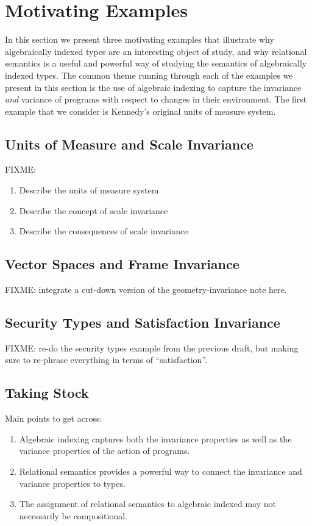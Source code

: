 \section{Motivating Examples}
\label{sec:motivating-examples}

In this section we present three motivating examples that illustrate
why algebraically indexed types are an interesting object of study,
and why relational semantics is a useful and powerful way of studying
the semantics of algebraically indexed types. The common theme running
through each of the examples we present in this section is the use of
algebraic indexing to capture the invariance \emph{and} variance of
programs with respect to changes in their environment. The first
example that we consider is Kennedy's original units of measure
system.

\subsection{Units of Measure and Scale Invariance}
\label{sec:units-of-measure-example-intro}

FIXME:
\begin{enumerate}
\item Describe the units of measure system
\item Describe the concept of scale invariance
\item Describe the consequences of scale invariance
\end{enumerate}

\subsection{Vector Spaces and Frame Invariance}
\label{sec:vector-spaces-intro}

FIXME: integrate a cut-down version of the geometry-invariance note
here.

\subsection{Security Types and Satisfaction Invariance}
\label{sec:security-types-intro}

FIXME: re-do the security types example from the previous draft, but
making sure to re-phrase everything in terms of ``satisfaction''.

\subsection{Taking Stock}
\label{sec:taking-stock}

Main points to get across:
\begin{enumerate}
\item Algebraic indexing captures both the invariance properties as
  well as the variance properties of the action of programs.
\item Relational semantics provides a powerful way to connect the
  invariance and variance properties to types.
\item The assignment of relational semantics to algebraic indexed may
  not necessarily be compositional.
\end{enumerate}
